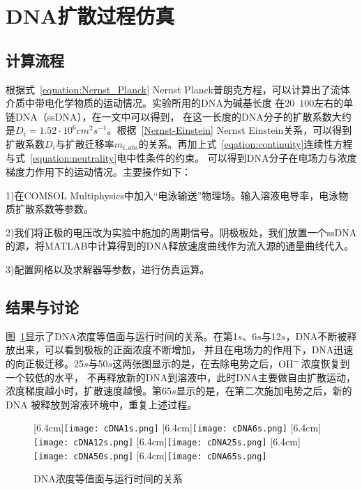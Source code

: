\section{DNA扩散过程仿真}
\subsection{计算流程}
根据式~\ref{equation:Nernst_Planck} Nernst Planck普朗克方程，可以计算出了流体介质中带电化学物质的运动情况。实验所用的DNA为碱基长度
在$20$~$100$左右的单链DNA（ssDNA），在\parencite{Stellwagen2003}一文中可以得到，
在这一长度的DNA分子的扩散系数大约是$D_i=1.52\cdot 10^6cm^2 s^{-1}$。根据~\ref{Nernst-Einstein} Nernst Einstein关系，可以得到
扩散系数$D_i$与扩散迁移率$m_{i,abs}$的关系。再加上式~\ref{eqation:continuity}连续性方程与式~\ref{equation:neutrality}电中性条件的约束。
可以得到DNA分子在电场力与浓度梯度力作用下的运动情况。主要操作如下：

1)在COMSOL Multiphysics中加入“电泳输送”物理场。输入溶液电导率，电泳物质扩散系数等参数。

2)我们将正极的电压改为实验中施加的周期信号。阴极板处，我们放置一个ssDNA的源，将MATLAB中计算得到的DNA释放速度曲线作为流入源的通量曲线代入。

3)配置网格以及求解器等参数，进行仿真运算。

\subsection{结果与讨论}
图~\ref{fig:cDNA1}显示了DNA浓度等值面与运行时间的关系。在第1$s$、6$s$与12$s$，DNA不断被释放出来，可以看到极板的正面浓度不断增加，
并且在电场力的作用下，DNA迅速的向正极迁移。25$s$与50$s$这两张图显示的是，在去除电势之后，$\ce{OH-}$浓度恢复到一个较低的水平，
不再释放新的DNA到溶液中，此时DNA主要做自由扩散运动，浓度梯度越小时，扩散速度越慢。第65$s$显示的是，在第二次施加电势之后，新的DNA
被释放到溶液环境中，重复上述过程。

\begin{figure}[p]
    \centering
                    [6.4cm]{\texttt{[image: cDNA1s.png]}}
    \hspace{1cm}
                    [6.4cm]{\texttt{[image: cDNA6s.png]}}
    \centering
                    [6.4cm]{\texttt{[image: cDNA12s.png]}}
    \hspace{1cm}
                    [6.4cm]{\texttt{[image: cDNA25s.png]}}
    \centering
                    [6.4cm]{\texttt{[image: cDNA50s.png]}}
    \hspace{1cm}
                    [6.4cm]{\texttt{[image: cDNA65s.png]}}
    \caption{DNA浓度等值面与运行时间的关系}
    \label{fig:cDNA1}
\end{figure}

